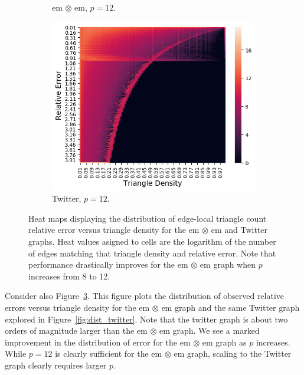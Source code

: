 \documentclass[10]{report}
\begin{document}
\begin{figure}
\begin{center}
\begin{subfigure}{0.32\linewidth}
			\caption{em $\otimes$ em, $p=12$. \label{fig:em_x_em_edge_density_vs_rel_err_p12}}
		\end{subfigure}
		\begin{subfigure}{0.32\linewidth}
			\centerline{\includegraphics[width=1.0\columnwidth]{twitter_edge_dist_p12}}
			\caption{Twitter, $p=12$. \label{fig:twitter_edge_density_vs_rel_err_p12}}
		\end{subfigure}
		\caption{Heat maps displaying the distribution of edge-local triangle count relative error versus triangle density for the em $\otimes$ em and Twitter graphs. 
			Heat values asigned to cells are the logarithm of the number of edges matching that triangle density and relative error.
		 	Note that performance drastically improves for the em $\otimes$ em graph when $p$ increases from 8 to 12.
			\label{fig:edge_density_vs_rel_err}}
	\end{center}
\end{figure}

Consider also Figure~\ref{fig:edge_density_vs_rel_err}. 
This figure plots the distribution of observed relative errors versus triangle density for the em $\otimes$ em graph and the same Twitter graph explored in Figure~\ref{fig:dist_twitter}.
Note that the twitter graph is about two orders of magnitude larger than the em $\otimes$ em graph. 
We see a marked improvement in the distribution of error for the em $\otimes$ em graph as $p$ increases. 
While $p=12$ is clearly sufficient for the em $\otimes$ em graph, scaling to the Twitter graph clearly requires larger $p$.
\end{document}
